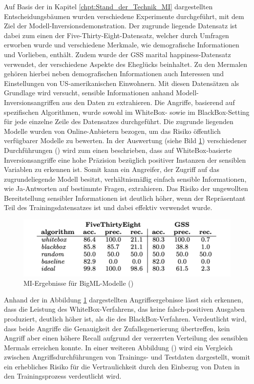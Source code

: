 Auf Basis der in Kapitel \ref{chpt:Stand_der_Technik_MI} dargestellten Entscheidungsbäumen wurden verschiedene Experimente durchgeführt, mit dem Ziel der Modell-Inversionsdemonstration. Der zugrunde liegende Datensatz ist dabei zum einen der \glqq Five-Thirty-Eight\grqq{}-Datensatz, welcher durch Umfragen erworben wurde und verschiedene Merkmale, wie demografische Informationen und Vorlieben, enthält. Zudem wurde der \glqq GSS marital happiness\grqq{}-Datensatz verwendet, der verschiedene Aspekte des Eheglücks beinhaltet. Zu den Mermalen gehören hierbei neben demografischen Informationen auch Interessen und Einstellungen von US-amerikanischen Einwohnern. Mit diesen Datensätzen als Grundlage wird versucht, sensible Informationen anhand Modell-Inversionsangriffen aus den Daten zu extrahieren. Die Angriffe, basierend auf spezifischen Algorithmen, wurde sowohl im WhiteBox- sowie im BlackBox-Setting für jede einzelne Zeile des Datensatzes durchgeführt. Die zugrunde liegenden Modelle wurden von \glqq Online-Anbietern\grqq{} bezogen, um das Risiko öffentlich verfügbarer Modelle zu bewerten. In der Auswertung (siehe Bild \ref{img:frederikson_2015_evaluation}) verschiedener Durchführungen (\cite[S. 5 ff.]{fredrikson_model_2015}) wird zum einen beschrieben, dass auf WhiteBox-basierte Inversionsangriffe eine hohe Präzision bezüglich positiver Instanzen der sensiblen Variablen zu erkennen ist. Somit kann ein Angreifer, der Zugriff auf das zugrundeliegende Modell besitzt, verhältnismäßig einfach sensible Informationen, wie \glqq Ja\grqq{}-Antworten auf bestimmte Fragen, extrahieren. Das Risiko der \glqq ungewollten Bereitstellung\grqq{} sensibler Informationen ist deutlich höher, wenn der Repräsentant Teil des Trainingsdatensatzes ist und dabei effektiv verwendet wurde. 
\begin{figure}[H]
	\centering
	\includegraphics[width=0.6\linewidth]{Bilder/frederikson_2015_1.png}
	\caption{MI-Ergebnisse für BigML-Modelle (\cite[S. 6, Figure 4]{fredrikson_model_2015})}
	\label{img:frederikson_2015_evaluation}
\end{figure}
Anhand der in Abbildung \ref{img:frederikson_2015_evaluation} dargestellten Angriffsergebnisse lässt sich erkennen, dass die Leistung des WhiteBox-Verfahrens, das keine falsch-positiven Ausgaben produziert, deutlich höher ist, als die des BlackBox-Verfahren. Verdeutlicht wird, dass beide Angriffe die Genauigkeit der Zufallsgenerierung übertreffen, kein Angriff aber einen höhere Recall aufgrund der verzerrten Verteilung des sensiblen Mermals erreichen konnte. In einer weiteren Abbildung (\cite[S. 7, Figure 5]{fredrikson_model_2015}) wird ein Vergleich zwischen Angriffsdurchführungen von Trainings- und Testdaten dargestellt, womit ein erhebliches Risiko für die Vertraulichkeit durch den Einbezug von Daten in den Trainingsprozess verdeutlicht wird. 
